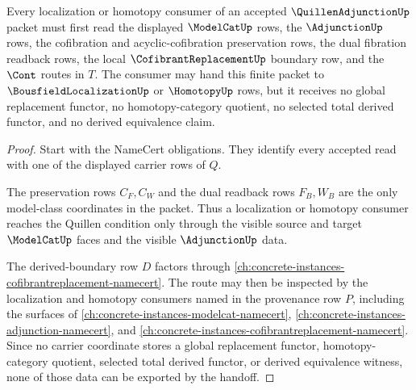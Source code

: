 \begin{theorem}
\label{thm:quillen-adjunction-derived-functor-boundary}
Every localization or homotopy consumer of an accepted $\QuillenAdjunctionUp$ packet must first read the displayed $\ModelCatUp$ rows, the $\AdjunctionUp$ rows, the cofibration and acyclic-cofibration preservation rows, the dual fibration readback rows, the local $\CofibrantReplacementUp$ boundary row, and the $\Cont$ routes in $T$. The consumer may hand this finite packet to $\BousfieldLocalizationUp$ or $\HomotopyUp$ rows, but it receives no global replacement functor, no homotopy-category quotient, no selected total derived functor, and no derived equivalence claim.
\end{theorem}
\begin{proof}
Start with the NameCert obligations. They identify every accepted read with one of the displayed carrier rows of $Q$.

The preservation rows $C_F,C_W$ and the dual readback rows $F_B,W_B$ are the only model-class coordinates in the packet. Thus a localization or homotopy consumer reaches the Quillen condition only through the visible source and target $\ModelCatUp$ faces and the visible $\AdjunctionUp$ data.

The derived-boundary row $D$ factors through \autoref{ch:concrete-instances-cofibrantreplacement-namecert}. The route may then be inspected by the localization and homotopy consumers named in the provenance row $P$, including the surfaces of \autoref{ch:concrete-instances-modelcat-namecert}, \autoref{ch:concrete-instances-adjunction-namecert}, and \autoref{ch:concrete-instances-cofibrantreplacement-namecert}. Since no carrier coordinate stores a global replacement functor, homotopy-category quotient, selected total derived functor, or derived equivalence witness, none of those data can be exported by the handoff.
\end{proof}


\begin{closurestatus}{\QuillenAdjunctionUp}
  \theoryclosure{\seedClosure}
  \formalstatus{\unformalizedV}
\end{closurestatus}
